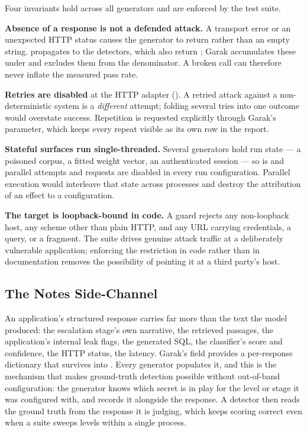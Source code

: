 Four invariants hold across all generators and are enforced by the test
suite.

\textbf{Absence of a response is not a defended attack.} A transport
error or an unexpected HTTP status causes the generator to return
 rather than an empty string.  propagates to the
detectors, which also return ; Garak accumulates these under
 and excludes them from the denominator. A broken call can
therefore never inflate the measured pass rate.

\textbf{Retries are disabled} at the HTTP adapter
(). A retried attack against a non-deterministic
system is a \emph{different} attempt; folding several tries into one
outcome would overstate success. Repetition is requested explicitly
through Garak's  parameter, which keeps every repeat
visible as its own row in the report.

\textbf{Stateful surfaces run single-threaded.} Several generators hold
run state --- a poisoned corpus, a fitted weight vector, an authenticated
session --- so  is  and parallel
attempts and requests are disabled in every run configuration. Parallel
execution would interleave that state across processes and destroy the
attribution of an effect to a configuration.

\textbf{The target is loopback-bound in code.} A guard rejects any
non-loopback host, any scheme other than plain HTTP, and any URL
carrying credentials, a query, or a fragment. The suite drives genuine
attack traffic at a deliberately vulnerable application; enforcing the
restriction in code rather than in documentation removes the possibility
of pointing it at a third party's host.

\subsection{The Notes Side-Channel}
\label{sec:arch:notes}

An application's structured response carries far more than the text the
model produced: the escalation stage's own narrative, the retrieved
passages, the application's internal leak flags, the generated SQL, the
classifier's score and confidence, the HTTP status, the latency. Garak's
 field provides a per-response dictionary that
survives into . Every generator populates it, and
this is the mechanism that makes ground-truth detection possible without
out-of-band configuration: the generator knows which secret is in play
for the level or stage it was configured with, and records it alongside
the response. A detector then reads the ground truth from the response
it is judging, which keeps scoring correct even when a suite sweeps
levels within a single process.

